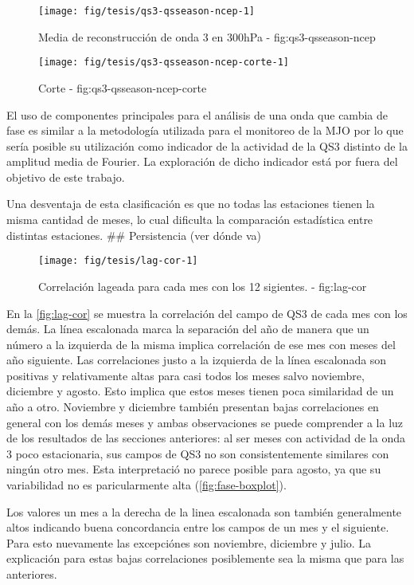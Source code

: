 \documentclass[spanish,a4paper,12p]{book}
\begin{document}
\begin{figure*}
\texttt{[image: fig/tesis/qs3-qsseason-ncep-1]} \caption{Media de reconstrucción de onda 3 en 300hPa - fig:qs3-qsseason-ncep}\label{fig:qs3-qsseason-ncep}
\end{figure*}

\begin{figure*}
\texttt{[image: fig/tesis/qs3-qsseason-ncep-corte-1]} \caption{Corte - fig:qs3-qsseason-ncep-corte}\label{fig:qs3-qsseason-ncep-corte}
\end{figure*}

El uso de componentes principales para el análisis de una onda que
cambia de fase es similar a la metodología utilizada para el monitoreo
de la MJO por lo que sería posible su utilización como
indicador de la actividad de la QS3 distinto de la amplitud media de
Fourier. La exploración de dicho indicador está por fuera del objetivo
de este trabajo.

Una desventaja de esta clasificación es que no todas las estaciones
tienen la misma cantidad de meses, lo cual dificulta la comparación
estadística entre distintas estaciones. \#\# Persistencia (ver dónde va)

\begin{figure*}
\texttt{[image: fig/tesis/lag-cor-1]} \caption{Correlación lageada para cada mes con los 12 sigientes. - fig:lag-cor}\label{fig:lag-cor}
\end{figure*}

En la \autoref{fig:lag-cor} se muestra la correlación del campo de QS3
de cada mes con los demás. La línea escalonada marca la separación del
año de manera que un número a la izquierda de la misma implica
correlación de ese mes con meses del año siguiente. Las correlaciones
justo a la izquierda de la línea escalonada son positivas y
relativamente altas para casi todos los meses salvo noviembre, diciembre
y agosto. Esto implica que estos meses tienen poca similaridad de un año
a otro. Noviembre y diciembre también presentan bajas correlaciones en
general con los demás meses y ambas observaciones se puede comprender a
la luz de los resultados de las secciones anteriores: al ser meses con
actividad de la onda 3 poco estacionaria, sus campos de QS3 no son
consistentemente similares con ningún otro mes. Esta interpretació no
parece posible para agosto, ya que su variabilidad no es paricularmente
alta (\autoref{fig:fase-boxplot}).

Los valores un mes a la derecha de la linea escalonada son también
generalmente altos indicando buena concordancia entre los campos de un
mes y el siguiente. Para esto nuevamente las excepciónes son noviembre,
diciembre y julio. La explicación para estas bajas correlaciones
posiblemente sea la misma que para las anteriores.
\end{document}
